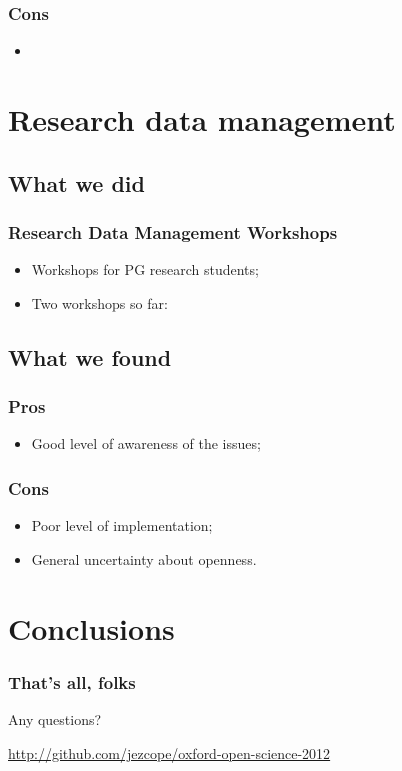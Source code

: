 \documentclass{beamer}
\begin{document}
\begin{frame}
  \frametitle{Cons}
  
  \begin{itemize}
    \item 
  \end{itemize}
\end{frame}

\section{Research data management}

\subsection{What we did}

\begin{frame}
  \frametitle{Research Data Management Workshops}
 
  \begin{itemize}
    \item Workshops for PG research students;
    \item Two workshops so far:
      \begin{itemize}
        
      \end{itemize}
  \end{itemize}
\end{frame}

\subsection{What we found}

\begin{frame}
  \frametitle{Pros}
  
  \begin{itemize}
    \item Good level of awareness of the issues;
  \end{itemize}
\end{frame}

\begin{frame}
  \frametitle{Cons}
  
  \begin{itemize}
    \item Poor level of implementation;
    \item General uncertainty about openness.
  \end{itemize}
\end{frame}

\section{Conclusions}

\begin{frame}
  \frametitle{That's all, folks}

  \begin{center}
    \Large Any questions?

    \vspace{3em}
    \small\url{http://github.com/jezcope/oxford-open-science-2012}\\\vspace{1em}
    \ccbysa
  \end{center}
\end{frame}
\end{document}
